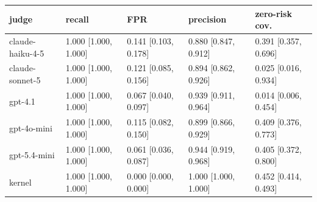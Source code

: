 \begin{tabular}{lllll}
\toprule
judge & recall & FPR & precision & zero-risk cov. \\
\midrule
claude-haiku-4-5 & 1.000 [1.000, 1.000] & 0.141 [0.103, 0.178] & 0.880 [0.847, 0.912] & 0.391 [0.357, 0.696] \\
claude-sonnet-5 & 1.000 [1.000, 1.000] & 0.121 [0.085, 0.156] & 0.894 [0.862, 0.926] & 0.025 [0.016, 0.934] \\
gpt-4.1 & 1.000 [1.000, 1.000] & 0.067 [0.040, 0.097] & 0.939 [0.911, 0.964] & 0.014 [0.006, 0.454] \\
gpt-4o-mini & 1.000 [1.000, 1.000] & 0.115 [0.082, 0.150] & 0.899 [0.866, 0.929] & 0.409 [0.376, 0.773] \\
gpt-5.4-mini & 1.000 [1.000, 1.000] & 0.061 [0.036, 0.087] & 0.944 [0.919, 0.968] & 0.405 [0.372, 0.800] \\
kernel & 1.000 [1.000, 1.000] & 0.000 [0.000, 0.000] & 1.000 [1.000, 1.000] & 0.452 [0.414, 0.493] \\
\bottomrule
\end{tabular}
